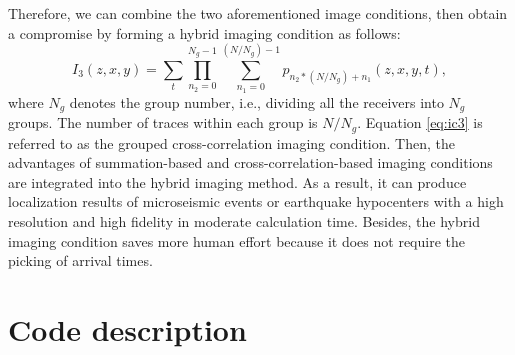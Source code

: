Therefore, we can combine the two aforementioned image conditions, then obtain a compromise by forming a hybrid imaging condition as follows: 
\begin{equation}\label{eq:ic3}
I_3(z,x,y)=\sum_{t}\prod_{n_2=0}^{N_g-1}\sum_{n_1=0}^{(N/N_g)-1} p_{n_2*(N/N_g)+n_1}(z,x,y,t),
\end{equation}
where $N_g$ denotes the group number, i.e., dividing all the receivers into $N_g$ groups.  The number of traces within each group is $N/N_g$. Equation \ref{eq:ic3} is referred to as the grouped cross-correlation imaging condition.  Then, the advantages of summation-based and cross-correlation-based imaging conditions are integrated into the hybrid imaging method. As a result, it can produce localization results of microseismic events or earthquake hypocenters with a high resolution and high fidelity in moderate calculation time. Besides, the hybrid imaging condition saves more human effort because it does not require the picking of arrival times.

\section{Code description}
